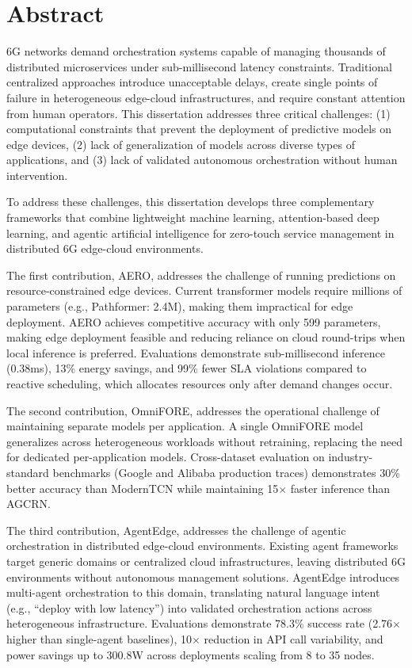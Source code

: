 \chapter*{Abstract}

\ac{6G} networks demand orchestration systems capable of managing thousands of distributed microservices under sub-millisecond latency constraints. Traditional centralized approaches introduce unacceptable delays, create single points of failure in heterogeneous edge-cloud infrastructures, and require constant attention from human operators. This dissertation addresses three critical challenges: (1) computational constraints that prevent the deployment of predictive models on edge devices, (2) lack of generalization of models across diverse types of applications, and (3) lack of validated autonomous orchestration without human intervention.

To address these challenges, this dissertation develops three complementary frameworks that combine lightweight machine learning, attention-based deep learning, and agentic artificial intelligence for zero-touch service management in distributed 6G edge-cloud environments.

The first contribution, \acf{AERO}, addresses the challenge of running predictions on resource-constrained edge devices. Current transformer models require millions of parameters (e.g., Pathformer: 2.4M), making them impractical for edge deployment. \ac{AERO} achieves competitive accuracy with only 599 parameters, making edge deployment feasible and reducing reliance on cloud round-trips when local inference is preferred. Evaluations demonstrate sub-millisecond inference (0.38ms), 13\% energy savings, and 99\% fewer \ac{SLA} violations compared to reactive scheduling, which allocates resources only after demand changes occur.

The second contribution, \acf{OmniFORE}, addresses the operational challenge of maintaining separate models per application. A single \ac{OmniFORE} model generalizes across heterogeneous workloads without retraining, replacing the need for dedicated per-application models. Cross-dataset evaluation on industry-standard benchmarks (Google and Alibaba production traces) demonstrates 30\% better accuracy than \ac{ModernTCN} while maintaining 15$\times$ faster inference than \ac{AGCRN}.

The third contribution, \acf{AgentEdge}, addresses the challenge of agentic orchestration in distributed edge-cloud environments. Existing agent frameworks target generic domains or centralized cloud infrastructures, leaving distributed 6G environments without autonomous management solutions. \ac{AgentEdge} introduces multi-agent orchestration to this domain, translating natural language intent (e.g., ``deploy with low latency'') into validated orchestration actions across heterogeneous infrastructure. Evaluations demonstrate 78.3\% success rate (2.76$\times$ higher than single-agent baselines), 10$\times$ reduction in API call variability, and power savings up to 300.8W across deployments scaling from 8 to 35 nodes.

